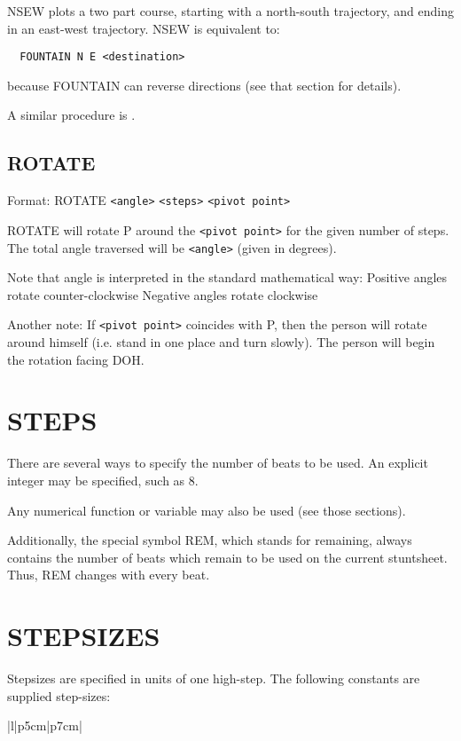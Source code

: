 NSEW plots a two part course, starting with a north-south trajectory, and
ending in an east-west trajectory.  NSEW is equivalent to:
\begin{verbatim}
  FOUNTAIN N E <destination>
\end{verbatim}
because FOUNTAIN can reverse directions (see that section for details).

A similar procedure is .

\subsection{ROTATE}\label{rotate}

Format: ROTATE \verb$<angle>$ \verb$<steps>$ \verb$<pivot point>$

ROTATE will rotate P around the \verb$<pivot point>$ for the given
number of steps.  The total angle traversed will be \verb$<angle>$ (given in
degrees).

Note that angle is interpreted in the standard mathematical way:
  Positive angles rotate counter-clockwise
  Negative angles rotate clockwise

Another note:  If \verb$<pivot point>$ coincides with P, then the person will
rotate around himself (i.e. stand in one place and turn slowly).  The
person will begin the rotation facing DOH.

\section{STEPS}\label{steps}

There are several ways to specify the number of beats to be used.  An
explicit integer may be specified, such as 8.

Any numerical function or variable may also be used (see those sections).

Additionally, the special symbol REM, which stands for remaining, always
contains the number of beats which remain to be used on the current
stuntsheet.  Thus, REM changes with every beat.

\section{STEPSIZES}\label{stepsizes}

Stepsizes are specified in units of one high-step.  The following constants
are supplied step-sizes:

\begin{tabular}{|l|p{5cm}|p{7cm}|}\hline
{}\hline\hline
{}
\end{tabular}

